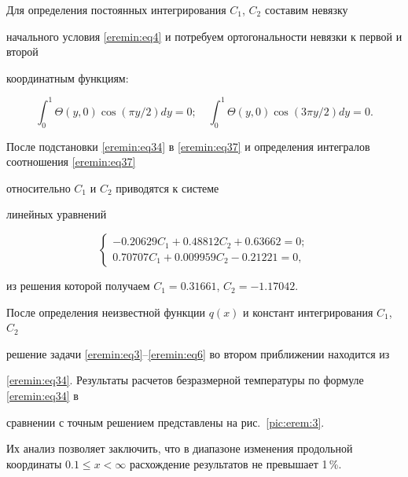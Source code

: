 Для определения постоянных интегрирования $C_1$, $C_2$ составим невязку

начального условия \eqref{eremin:eq4} и потребуем ортогональности невязки к первой и второй

координатным функциям:

\begin{equation}

\label{eremin:eq37}

\int _0^1 \Theta (y, 0)\cos (\pi y/2)dy=0; \quad

\int _0^1 \Theta (y, 0) \cos (3\pi y/2) dy=0.

\end{equation}

После подстановки \eqref{eremin:eq34} в \eqref{eremin:eq37} и определения интегралов соотношения \eqref{eremin:eq37}

относительно $C_1$ и $C_2$ приводятся к системе 

линейных уравнений

\begin{equation}

\label{eremin:eq38}

\begin{cases}

-0.20629 C_1 +0.48812 C_2 +0.63662=0; \\

 0.70707 C_1 +0.009959 C_2 - 0.21221=0,  

\end{cases}

\end{equation}

из решения которой получаем $C_1 =0.31661$, $C_2 =-1.17042$.



После определения неизвестной функции $q(x)$ и констант интегрирования $C_1$, $C_2$

решение задачи \eqref{eremin:eq3}--\eqref{eremin:eq6} во втором приближении находится из

\eqref{eremin:eq34}. Результаты расчетов безразмерной температуры по формуле \eqref{eremin:eq34} в

сравнении с точным решением представлены на рис.~\ref{pic:erem:3}. 

Их анализ позволяет заключить, что в диапазоне изменения продольной координаты $0.1\le

x<\infty$ расхождение результатов не превышает 1\,\%.





